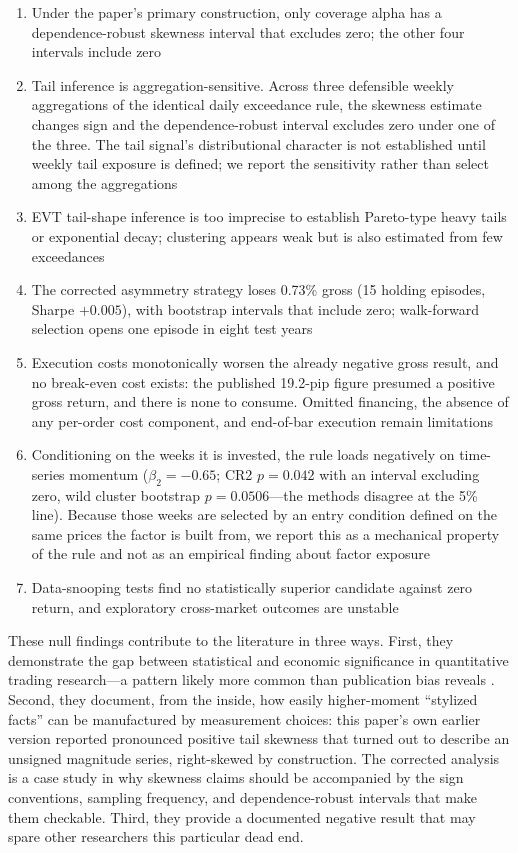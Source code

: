 \documentclass[11pt]{article}
\begin{document}
\begin{enumerate}
    \item Under the paper's primary construction, only coverage alpha has a dependence-robust skewness interval that excludes zero; the other four intervals include zero
    \item Tail inference is aggregation-sensitive. Across three defensible weekly aggregations of the identical daily exceedance rule, the skewness estimate changes sign and the dependence-robust interval excludes zero under one of the three. The tail signal's distributional character is not established until weekly tail exposure is defined; we report the sensitivity rather than select among the aggregations
    \item EVT tail-shape inference is too imprecise to establish Pareto-type heavy tails or exponential decay; clustering appears weak but is also estimated from few exceedances
    \item The corrected asymmetry strategy loses 0.73\% gross (15 holding episodes, Sharpe $+0.005$), with bootstrap intervals that include zero; walk-forward selection opens one episode in eight test years
    \item Execution costs monotonically worsen the already negative gross result, and no break-even cost exists: the published 19.2-pip figure presumed a positive gross return, and there is none to consume. Omitted financing, the absence of any per-order cost component, and end-of-bar execution remain limitations
    \item Conditioning on the weeks it is invested, the rule loads negatively on time-series momentum ($\beta_2 = -0.65$; CR2 $p = 0.042$ with an interval excluding zero, wild cluster bootstrap $p = 0.0506$---the methods disagree at the 5\% line). Because those weeks are selected by an entry condition defined on the same prices the factor is built from, we report this as a mechanical property of the rule and not as an empirical finding about factor exposure
    \item Data-snooping tests find no statistically superior candidate against zero return, and exploratory cross-market outcomes are unstable
\end{enumerate}

These null findings contribute to the literature in three ways. First, they demonstrate the gap between statistical and economic significance in quantitative trading research---a pattern likely more common than publication bias reveals \citep{harvey2017presidential}. Second, they document, from the inside, how easily higher-moment ``stylized facts'' can be manufactured by measurement choices: this paper's own earlier version reported pronounced positive tail skewness that turned out to describe an unsigned magnitude series, right-skewed by construction. The corrected analysis is a case study in why skewness claims should be accompanied by the sign conventions, sampling frequency, and dependence-robust intervals that make them checkable. Third, they provide a documented negative result that may spare other researchers this particular dead end.
\end{document}
